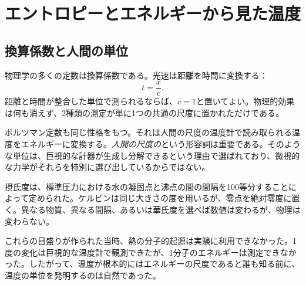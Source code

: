 \chapter{エントロピーとエネルギーから見た温度}


\section{換算係数と人間の単位}

物理学の多くの定数は換算係数である。光速は距離を時間に変換する：
\begin{equation}
 t=\frac{x}{c}.
\end{equation}
距離と時間が整合した単位で測られるならば、\(c=1\)と置いてよい。物理的効果は何も消えず、2種類の測定が単に1つの共通の尺度に置かれただけである。

ボルツマン定数も同じ性格をもつ。それは人間の尺度の温度計で読み取られる温度をエネルギーに変換する。\emph{人間の尺度の}という形容詞は重要である。そのような単位は、巨視的な計器が生成し分解できるという理由で選ばれており、微視的な力学がそれらを特別に選び出しているからではない。

摂氏度は、標準圧力における水の凝固点と沸点の間の間隔を100等分することによって定められた。ケルビンは同じ大きさの度を用いるが、零点を絶対零度に置く。異なる物質、異なる間隔、あるいは華氏度を選べば数値は変わるが、物理は変わらない。

\begin{classroomqa}
\end{classroomqa}

これらの目盛りが作られた当時、熱の分子的起源は実験に利用できなかった。1度の変化は巨視的な温度計で観測できたが、1分子のエネルギーは測定できなかった。したがって、温度が根本的にはエネルギーの尺度であると誰も知る前に、温度の単位を発明するのは自然であった。

